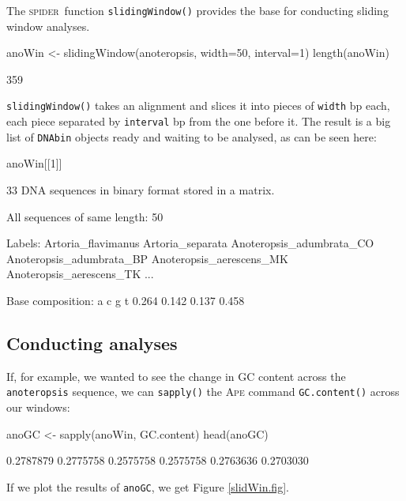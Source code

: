 \documentclass{article}
\newcommand{\spider}{\textsc{spider}} %
\newcommand{\progname}[1]{\textsc{#1}}
\newcommand{\fun}[1]{\texttt{#1}}
\begin{document}
The \spider~function \fun{slidingWindow()} provides the base for conducting sliding window analyses. 

\begin{console}
anoWin <- slidingWindow(anoteropsis, width=50, interval=1)
length(anoWin)
\end{console}

\begin{Routput}
[1] 359
\end{Routput}

\fun{slidingWindow()} takes an alignment and slices it into pieces of \fun{width} bp each, each piece separated by \fun{interval} bp from the one before it. The result is a big list of \fun{DNAbin} objects ready and waiting to be analysed, as can be seen here:

\begin{console}
anoWin[[1]]
\end{console}

\begin{Routput}
33 DNA sequences in binary format stored in a matrix.

All sequences of same length: 50 

Labels: Artoria_flavimanus Artoria_separata Anoteropsis_adumbrata_CO 
Anoteropsis_adumbrata_BP Anoteropsis_aerescens_MK Anoteropsis_aerescens_TK ...

Base composition:
    a     c     g     t 
0.264 0.142 0.137 0.458 
\end{Routput}

\subsection{Conducting analyses}

If, for example, we wanted to see the change in GC content across the \fun{anoteropsis} sequence, we can \fun{sapply()} the \progname{Ape} command \fun{GC.content()} across our windows:

\begin{console}
anoGC <- sapply(anoWin, GC.content)
head(anoGC)
\end{console}
\begin{Routput}
[1] 0.2787879 0.2775758 0.2575758 0.2575758 0.2763636 0.2703030
\end{Routput}

If we plot the results of \fun{anoGC}, we get Figure \ref{slidWin.fig}.
\end{document}
